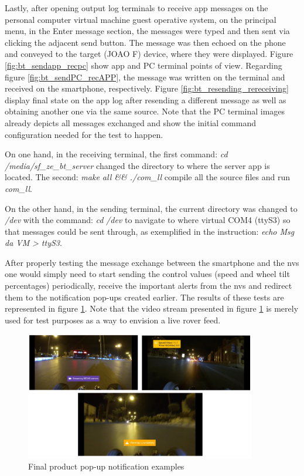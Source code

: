 Lastly, after opening output log terminals to receive app messages on the personal computer virtual machine guest operative system, on the principal menu, in the Enter message section, the messages were typed and then sent via clicking the adjacent send button. The message was then echoed on the phone and conveyed to the target (JOAO F) device, where they were displayed. Figure \ref{fig:bt_sendapp_recpc} show app and PC terminal points of view. Regarding figure \ref{fig:bt_sendPC_recAPP}, the message was written on the terminal and received on the smartphone, respectively. Figure \ref{fig:bt_resending_rereceiving} display final state on the app log after resending a different message as well as obtaining another one via the same source. Note that the PC terminal images already depicts all messages exchanged and show the initial command configuration needed for the test to happen.

On one hand, in the receiving terminal, the first command:  \emph{cd} \emph{/media/sf\_ze\_bt\_server}
changed the directory to where the server app is located. The second:  \emph{make all \&\& ./com\_ll} compile all the source files and run \emph{com\_ll}.

On the other hand, in the sending terminal, the current directory was changed to \emph{/dev} with the command:  \emph{cd}  \emph{/dev}
to navigate to where virtual COM4 (ttyS3) so that messages could be sent through, as exemplified in the instruction:  \emph{echo Msg da VM}  \emph{> ttyS3}.

After properly testing the message exchange between the smartphone and the \gls{nvs} one would simply need to start sending the control values (speed and wheel tilt percentages) periodically, receive the important alerts from the \gls{nvs} and redirect them to the notification pop-ups created earlier. The results of these tests are represented in figure \ref{fig:alert-toast}. Note that the video stream presented in figure \ref{fig:alert-toast} is merely used for test purposes as a way to envision a live rover feed.
%
\begin{figure}[!ht]
\centering
\includegraphics[width=0.9\textwidth]{img/alert-popups.png}
\caption{\label{fig:alert-toast}Final product pop-up notification examples}
\end{figure}
%